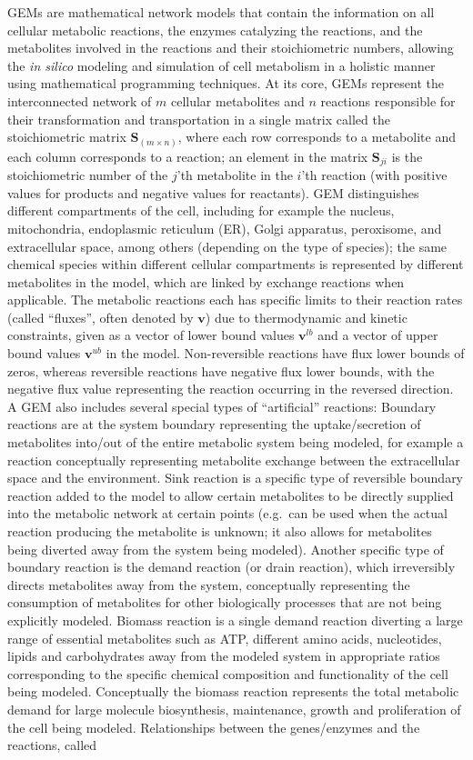 \documentclass[12pt,twoside,openany,\mydriver]{thesis}  %
\begin{document}
GEMs are mathematical network models that contain the information on all cellular metabolic reactions, the enzymes catalyzing the reactions, and the metabolites involved in the reactions and their stoichiometric numbers, allowing the \emph{in silico} modeling and simulation of cell metabolism in a holistic manner using mathematical programming techniques. At its core, GEMs represent the interconnected network of \(m\) cellular metabolites and \(n\) reactions responsible for their transformation and transportation in a single matrix called the stoichiometric matrix \(\mathbf S_{(m\times n)}\), where each row corresponds to a metabolite and each column corresponds to a reaction; an element in the matrix \(\mathbf S_{ji}\) is the stoichiometric number of the \(j\)'th metabolite in the \(i\)'th reaction (with positive values for products and negative values for reactants). GEM distinguishes different compartments of the cell, including for example the nucleus, mitochondria, endoplasmic reticulum (ER), Golgi apparatus, peroxisome, and extracellular space, among others (depending on the type of species); the same chemical species within different cellular compartments is represented by different metabolites in the model, which are linked by exchange reactions when applicable. The metabolic reactions each has specific limits to their reaction rates (called ``fluxes'', often denoted by \(\mathbf v\)) due to thermodynamic and kinetic constraints, given as a vector of lower bound values \(\mathbf v^{lb}\) and a vector of upper bound values \(\mathbf v^{ub}\) in the model. Non-reversible reactions have flux lower bounds of zeros, whereas reversible reactions have negative flux lower bounds, with the negative flux value representing the reaction occurring in the reversed direction. A GEM also includes several special types of ``artificial'' reactions: Boundary reactions are at the system boundary representing the uptake/secretion of metabolites into/out of the entire metabolic system being modeled, for example a reaction conceptually representing metabolite exchange between the extracellular space and the environment. Sink reaction is a specific type of reversible boundary reaction added to the model to allow certain metabolites to be directly supplied into the metabolic network at certain points (e.g.~can be used when the actual reaction producing the metabolite is unknown; it also allows for metabolites being diverted away from the system being modeled). Another specific type of boundary reaction is the demand reaction (or drain reaction), which irreversibly directs metabolites away from the system, conceptually representing the consumption of metabolites for other biologically processes that are not being explicitly modeled. Biomass reaction is a single demand reaction diverting a large range of essential metabolites such as ATP, different amino acids, nucleotides, lipids and carbohydrates away from the modeled system in appropriate ratios corresponding to the specific chemical composition and functionality of the cell being modeled. Conceptually the biomass reaction represents the total metabolic demand for large molecule biosynthesis, maintenance, growth and proliferation of the cell being modeled. Relationships between the genes/enzymes and the reactions, called 
\end{document}
